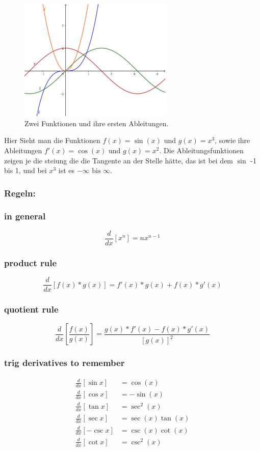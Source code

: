 \documentclass{report}
\begin{document}
\clearpage

\begin{figure}[htpb]
  \begin{center}
    \includegraphics[width=0.65\textwidth]{math-figures/2-abls.png}
  \end{center}
  \caption{Zwei Funktionen und ihre ersten Ableitungen.}
\end{figure}

Hier Sieht man die Funktionen $f(x)=\sin(x)$ und $g(x)=x^3$, sowie ihre
Ableitungen $f'(x)=\cos(x)$ und $g(x)=x^2$.
Die Ableitungsfunktionen zeigen je die steiung die die Tangente an der Stelle
hätte, das ist bei dem $\sin$ -1 bis 1, und bei $x^3$ ist es $-\infty\text{ bis }\infty$.

\subsubsection{Regeln:}
\subsubsection{in general}
\[\frac{d}{dx}[x^n] = nx^{n-1}\]

\subsubsection{product rule}
\[\frac{d}{dx}\left[f(x)*g(x)\right]=f'(x)*g(x)+f(x)*g'(x)\]

\subsubsection{quotient rule}
\[\frac{d}{dx} \left[\frac{f(x)}{g(x)}\right]=
\frac{g(x)*f'(x)-f(x)*g'(x)}{[g(x)]^2}\]

\subsubsection{trig derivatives to remember}
\begin{align*}
    \frac{d}{dx}[\sin x]&=\cos (x)\\
    \frac{d}{dx}[\cos x]&=-\sin(x)\\
    \frac{d}{dx}[\tan x]&=\sec^2 (x)\\
    \frac{d}{dx}[\sec x]&=\sec(x)\tan(x)\\
    \frac{d}{dx}[-\csc x]&=\csc(x)\cot(x)\\
    \frac{d}{dx}[\cot x]&=\csc^2(x)\\
\end{align*}
\end{document}
